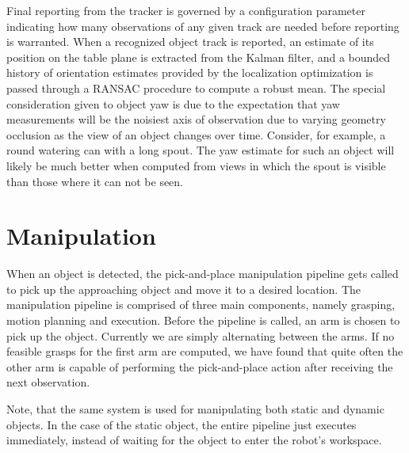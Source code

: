 \documentclass[letterpaper, 10 pt, conference]{ieeeconf}  %
\begin{document}
Final reporting from the tracker is governed by a configuration
parameter indicating how many observations of any given track are
needed before reporting is warranted. When a recognized object track
is reported, an estimate of its position on the table plane is
extracted from the Kalman filter, and a bounded history of orientation
estimates provided by the localization optimization is passed through
a RANSAC \cite{Fischler1981:RANSAC} procedure to compute a robust
mean. The special consideration given to object yaw is due to the
expectation that yaw measurements will be the noisiest axis of
observation due to varying geometry occlusion as the view of an object
changes over time. Consider, for example, a round watering can with a
long spout. The yaw estimate for such an object will likely be much
better when computed from views in which the spout is visible than
those where it can not be seen.



\section{Manipulation}

When an object is detected, the pick-and-place manipulation pipeline
gets called to pick up the approaching object and move it to a desired
location. The manipulation pipeline is comprised of three main
components, namely grasping, motion planning and execution. Before the
pipeline is called, an arm is chosen to pick up the object. Currently
we are simply alternating between the arms. If no feasible grasps for
the first arm are computed, we have found that quite often the other
arm is capable of performing the pick-and-place action after receiving
the next observation.

Note, that the same system is used for manipulating both static and
dynamic objects. In the case of the static object, the entire pipeline
just executes immediately, instead of waiting for the object to enter
the robot's workspace.
\end{document}
